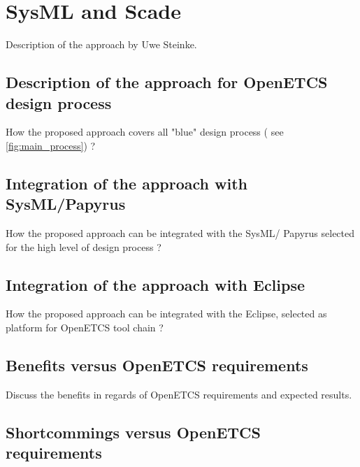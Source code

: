 \chapter{SysML and Scade}
\label{sec:sysML-Scade}


\begin{todo_comment}
Description of the approach by Uwe Steinke.
\end{todo_comment}

\section{Description of the approach for OpenETCS design process}

\begin{todo_comment}
How the proposed approach covers all "blue" design process ( see \ref{fig:main_process}) ?
\end{todo_comment}

\section{Integration of the approach with SysML/Papyrus}

\begin{todo_comment}
How the proposed approach can be integrated with the SysML/ Papyrus selected for the high level of design process ?
\end{todo_comment}

\section{Integration of the approach with Eclipse}

\begin{todo_comment}
How the proposed approach can be integrated with the Eclipse, selected as platform for OpenETCS tool chain ?
\end{todo_comment}

\section{Benefits versus OpenETCS requirements}

\begin{todo_comment}
Discuss the benefits in regards of OpenETCS requirements and expected results.
\end{todo_comment}

\section{Shortcommings versus OpenETCS requirements}


